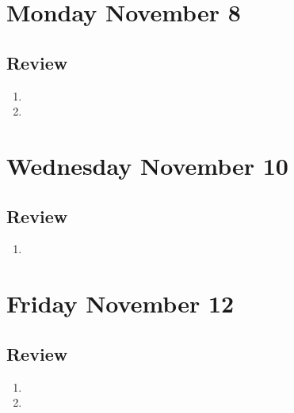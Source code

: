 

\section*{Monday November 8}





\subsection*{Review}
\begin{enumerate}
\item 
\item 
\end{enumerate}

\newpage

\section*{Wednesday November 10}




\subsection*{Review}
\begin{enumerate}
\item 
\end{enumerate}

\newpage

\section*{Friday November 12}







\subsection*{Review}
\begin{enumerate}
\item 
\item 
\end{enumerate}

